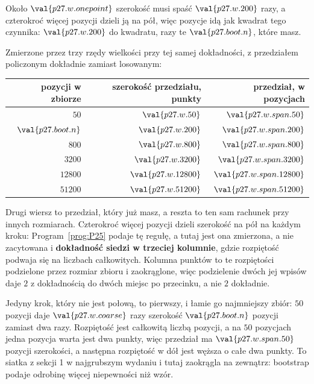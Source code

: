 \begin{fr}
\begin{ansblock}
Około $\val{p27.w.onepoint}$ \dash{} szerokość musi spaść
$\val{p27.w.200}$ razy, a czterokroć więcej pozycji dzieli ją na pół, więc
pozycje idą jak kwadrat tego czynnika: $\val{p27.w.200}$ do kwadratu, razy te
$\val{p27.boot.n}$, które masz.
\end{ansblock}

Zmierzone przez trzy rzędy wielkości przy tej samej dokładności, z
przedziałem policzonym dokładnie zamiast losowanym:

\begin{center}
\begin{tabular}{rrr}
\toprule
pozycji w zbiorze & szerokość przedziału, punkty & przedział, w pozycjach \\
\midrule
$50$ & $\val{p27.w.50}$ & $\val{p27.w.span.50}$ \\
$\val{p27.boot.n}$ & $\val{p27.w.200}$ & $\val{p27.w.span.200}$ \\
$800$ & $\val{p27.w.800}$ & $\val{p27.w.span.800}$ \\
$\num{3200}$ & $\val{p27.w.3200}$ & $\val{p27.w.span.3200}$ \\
$\num{12800}$ & $\val{p27.w.12800}$ & $\val{p27.w.span.12800}$ \\
$\num{51200}$ & $\val{p27.w.51200}$ & $\val{p27.w.span.51200}$ \\
\bottomrule
\end{tabular}
\end{center}

Drugi wiersz to przedział, który już masz, a reszta to ten sam rachunek przy
innych rozmiarach. Czterokroć więcej pozycji dzieli szerokość na pół na
każdym kroku: Program~\ref{prog:P25} podaje tę regułę, a tutaj jest ona
zmierzona, a nie zacytowana \dash{} i \textbf{dokładność siedzi w trzeciej
kolumnie}, gdzie rozpiętość podwaja się na liczbach całkowitych. Kolumna
punktów to te rozpiętości podzielone przez rozmiar zbioru i zaokrąglone, więc
podzielenie dwóch jej wpisów daje $2$ z dokładnością do dwóch miejsc po
przecinku, a nie $2$ dokładnie.

Jedyny krok, który nie jest połową, to pierwszy, i łamie go najmniejszy
zbiór: $50$ pozycji daje $\val{p27.w.coarse}$ razy szerokość
$\val{p27.boot.n}$ pozycji zamiast dwa razy. Rozpiętość jest całkowitą liczbą
pozycji, a na $50$ pozycjach jedna pozycja warta jest dwa punkty, więc
przedział ma $\val{p27.w.span.50}$ pozycji szerokości, a następna rozpiętość
w dół jest węższa o całe dwa punkty. To siatka z sekcji 1 w najgrubszym
wydaniu i tutaj zaokrągla na zewnątrz: bootstrap podaje odrobinę więcej
niepewności niż wzór.


\end{fr}
